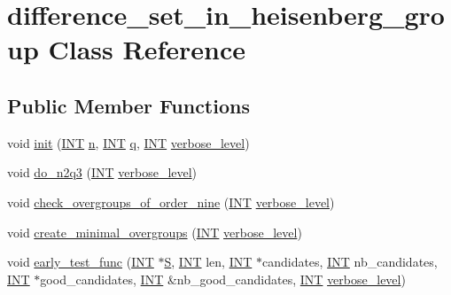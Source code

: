 \hypertarget{classdifference__set__in__heisenberg__group}{}\section{difference\+\_\+set\+\_\+in\+\_\+heisenberg\+\_\+group Class Reference}
\label{classdifference__set__in__heisenberg__group}
\subsection*{Public Member Functions}
\begin{DoxyCompactItemize}
\item 
void \mbox{\hyperlink{classdifference__set__in__heisenberg__group_ab44797f49aa0c8858e79cdb118c0bfd4}{init}} (\mbox{\hyperlink{galois_8h_a09fddde158a3a20bd2dcadb609de11dc}{I\+NT}} \mbox{\hyperlink{classdifference__set__in__heisenberg__group_af241d9c850e6926be43e11dbad972af4}{n}}, \mbox{\hyperlink{galois_8h_a09fddde158a3a20bd2dcadb609de11dc}{I\+NT}} \mbox{\hyperlink{classdifference__set__in__heisenberg__group_acfacdc39989d3179d181a51d6b6402c3}{q}}, \mbox{\hyperlink{galois_8h_a09fddde158a3a20bd2dcadb609de11dc}{I\+NT}} \mbox{\hyperlink{simeon_8_c_a818073fbcc2f439e7c56952f67386122}{verbose\+\_\+level}})
\item 
void \mbox{\hyperlink{classdifference__set__in__heisenberg__group_aca82ff116dd5d17cfbb311e809b6d023}{do\+\_\+n2q3}} (\mbox{\hyperlink{galois_8h_a09fddde158a3a20bd2dcadb609de11dc}{I\+NT}} \mbox{\hyperlink{simeon_8_c_a818073fbcc2f439e7c56952f67386122}{verbose\+\_\+level}})
\item 
void \mbox{\hyperlink{classdifference__set__in__heisenberg__group_af7075193cf272d5b63356e21ec1ab8a8}{check\+\_\+overgroups\+\_\+of\+\_\+order\+\_\+nine}} (\mbox{\hyperlink{galois_8h_a09fddde158a3a20bd2dcadb609de11dc}{I\+NT}} \mbox{\hyperlink{simeon_8_c_a818073fbcc2f439e7c56952f67386122}{verbose\+\_\+level}})
\item 
void \mbox{\hyperlink{classdifference__set__in__heisenberg__group_a9bde5ad5da3ebaebf98fbfd3e8110b79}{create\+\_\+minimal\+\_\+overgroups}} (\mbox{\hyperlink{galois_8h_a09fddde158a3a20bd2dcadb609de11dc}{I\+NT}} \mbox{\hyperlink{simeon_8_c_a818073fbcc2f439e7c56952f67386122}{verbose\+\_\+level}})
\item 
void \mbox{\hyperlink{classdifference__set__in__heisenberg__group_a57bdb7e4a1204a851804cdc2002f52ba}{early\+\_\+test\+\_\+func}} (\mbox{\hyperlink{galois_8h_a09fddde158a3a20bd2dcadb609de11dc}{I\+NT}} $\ast$\mbox{\hyperlink{simeon_8_c_adab47f8243f1b5a2c31df2535d6b37d0}{S}}, \mbox{\hyperlink{galois_8h_a09fddde158a3a20bd2dcadb609de11dc}{I\+NT}} len, \mbox{\hyperlink{galois_8h_a09fddde158a3a20bd2dcadb609de11dc}{I\+NT}} $\ast$candidates, \mbox{\hyperlink{galois_8h_a09fddde158a3a20bd2dcadb609de11dc}{I\+NT}} nb\+\_\+candidates, \mbox{\hyperlink{galois_8h_a09fddde158a3a20bd2dcadb609de11dc}{I\+NT}} $\ast$good\+\_\+candidates, \mbox{\hyperlink{galois_8h_a09fddde158a3a20bd2dcadb609de11dc}{I\+NT}} \&nb\+\_\+good\+\_\+candidates, \mbox{\hyperlink{galois_8h_a09fddde158a3a20bd2dcadb609de11dc}{I\+NT}} \mbox{\hyperlink{simeon_8_c_a818073fbcc2f439e7c56952f67386122}{verbose\+\_\+level}})

\end{DoxyCompactItemize}
